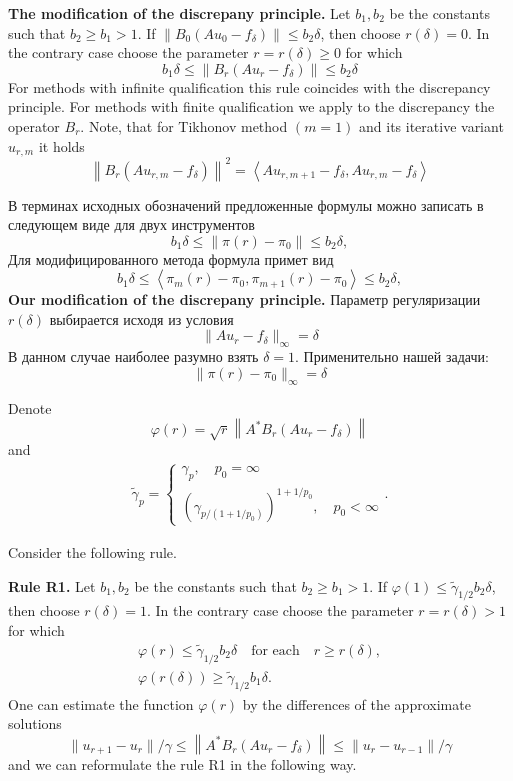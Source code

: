 \documentclass[10pt]{article}
\theoremstyle{definition}
\theoremstyle{remark}
\theoremstyle{plain}
\newcommand{\scalar}[2]{\left<#1,#2\right>}
\begin{document}
\textbf{The modification of the discrepany principle.} 
Let $b_1,b_2$ be the constants such that $b_2\geqslant b_1 > 1$. If $\left\|B_0(Au_0 - f_\delta)\right\|\leqslant b_2\delta$, then choose $r(\delta)=0$. In the contrary case choose the parameter $r = r(\delta)\geqslant 0$ for which 
$$
b_1\delta \leqslant \left\|B_r( Au_r - f_\delta) \right\| \leqslant b_2\delta
$$
For methods with infinite qualification this rule coincides with the discrepancy principle.
For methods with finite qualification we apply to the discrepancy the operator $B_r$.
Note, that for Tikhonov method $(m = 1)$ and its iterative variant $u_{r,m}$ it holds
$$
\left\|
	B_r(Au_{r,m} - f_\delta)
\right\|^2 
= 
\scalar
	{Au_{r,m+1} - f_\delta}
	{Au_{r,m} - f_\delta}
$$

В терминах исходных обозначений предложенные формулы можно записать в следующем виде для двух инструментов
$$
b_1\delta \leqslant \left\| \pi(r) - \pi_0 \right\| \leqslant b_2\delta,
$$
Для модифицированного метода формула примет вид
$$
b_1\delta \leqslant \scalar{\pi_m(r) - \pi_0}{\pi_{m+1}(r) - \pi_0} \leqslant b_2\delta,
$$
\textbf{Our modification of the discrepany principle.}
Параметр регуляризации $r(\delta)$ выбирается исходя из условия
$$
\|Au_r - f_\delta \|_{\infty}  = \delta
$$
В данном случае наиболее разумно взять $\delta = 1$.
Применительно нашей задачи:
$$
\|\pi(r) - \pi_0 \|_{\infty}  = \delta
$$



Denote 
$$
\varphi(r) = \sqrt{r}\left\|A^*B_r(Au_r - f_\delta)\right\|
$$ 
and 
\begin{align*}
\tilde{\gamma}_p =
\left\{
	\begin{aligned}
	\gamma_p , \quad p_0 = \infty \\
	\left( \gamma_{p/(1 + 1/p_0)} \right) ^{1 + 1/p_0}, \quad p_0 < \infty
	\end{aligned}
\right.
.
\end{align*}

Consider the following
rule.

\textbf{Rule R1.}
Let $b_1,b_2$ be the constants such that $b_2\geqslant b_1 > 1$. If $\varphi(1)\leqslant \tilde{\gamma}_{1/2}b_2\delta$, then choose $r(\delta) = 1$. In the contrary case choose the parameter $r = r(\delta) >1$ for which 
\begin{gather*}
\varphi(r)\leqslant \tilde{\gamma}_{1/2} b_2\delta \quad \text{for each}\quad  r\geqslant r(\delta), \\
\varphi(r(\delta))\geqslant \tilde{\gamma}_{1/2} b_1\delta.
\end{gather*}
One can estimate the function $\varphi(r)$ by the differences of the approximate solutions
$$
\| u_{r+1} - u_r \| /\gamma 
\leqslant
\left\|
	A^*B_r(Au_r - f_\delta)
\right\|
\leqslant
\| u_{r} - u_{r-1} \| /\gamma 
$$
and we can reformulate the rule R1 in the following way.
\end{document}
